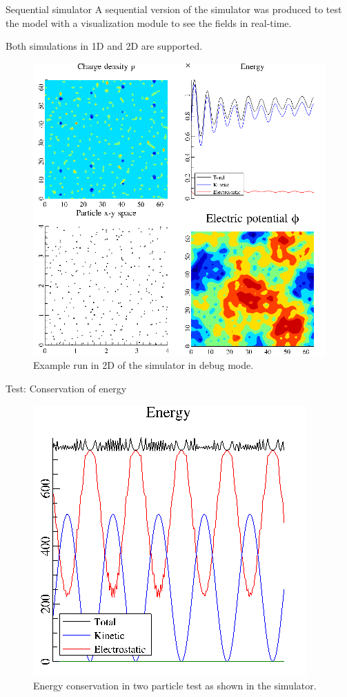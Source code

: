 \documentclass{beamer}
\begin{document}
\begin{frame}{Sequential simulator}{}
A sequential version of the simulator was produced to test the model with a 
visualization module to see the fields in real-time.

\vspace{1em}
Both simulations in 1D and 2D are supported.
\end{frame}
\begin{frame}{}{}
\begin{figure}[h]
	\centering
	\includegraphics[height=0.95\textheight]{landau.png}
	\caption{Example run in 2D of the simulator in debug mode.}
	\label{fig:debug-mode}
\end{figure}
\end{frame}

\begin{frame}{Test: Conservation of energy}{}
\begin{figure}[h]
	\centering
	\includegraphics[width=0.4\linewidth]{1d-2particles-energy.png}
	\caption{Energy conservation in two particle test as shown in the simulator.}
	\label{fig:1d-2particles-energy}
\end{figure}
\end{frame}
\end{document}
